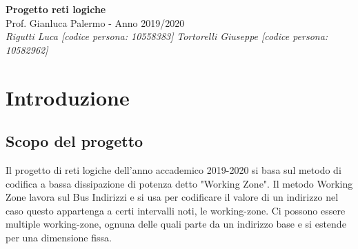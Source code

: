 \documentclass{article}
\begin{document}
\begin{titlepage}
   \begin{center}
      \Huge\textbf{Progetto reti logiche}\\
      \vspace{5mm} %
      \Large Prof. Gianluca Palermo - Anno 2019/2020\\
      \vspace{5mm} %
      \large\textit{Rigutti Luca [codice persona: 10558383]}
      \linebreak
      \large\textit{Tortorelli Giuseppe [codice persona: 10582962]}
   \end{center}
\end{titlepage}
\printindex

\tableofcontents
\pagebreak

\section{Introduzione}
\subsection{Scopo del progetto}
Il progetto di reti logiche dell'anno accademico 2019-2020 si basa sul metodo di codifica a bassa dissipazione di potenza detto "Working Zone".
Il metodo Working Zone lavora sul Bus Indirizzi e si usa per codificare il valore di un indirizzo nel caso questo appartenga a certi intervalli noti, le working-zone. Ci possono essere multiple working-zone, ognuna delle quali parte da un indirizzo base e si estende per una dimensione fissa.
\end{document}
